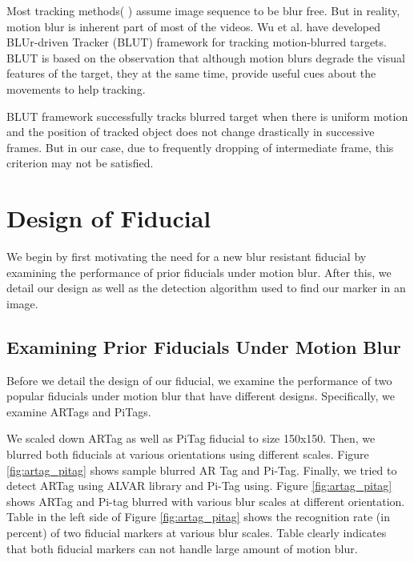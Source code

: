 \documentclass[runningheads]{llncs}
\begin{document}
Most tracking methods( \cite{Ross:2008,Wu:2009,Perez02}
\cite{Mei:2009} ) assume image sequence to be blur free. But in reality, motion
blur is inherent part of most of the videos. Wu et al.\cite{Wu:2011} have
developed BLUr-driven Tracker (BLUT) framework for tracking motion-blurred
targets. BLUT is based on the observation that although motion blurs degrade
the visual features of the target, they at the same time, provide useful cues
about the movements to help tracking.

BLUT framework successfully tracks blurred target when there is uniform motion
and the position of tracked object does not change drastically in successive
frames. But in our case, due to frequently dropping of intermediate frame, this
criterion may not be satisfied.

\section{Design of Fiducial}

We begin by first motivating the need for a new blur resistant fiducial by examining
the performance of prior fiducials under motion blur.  After this, we detail
our design as well as the detection algorithm used to find our marker in an image.

\subsection{Examining Prior Fiducials Under Motion Blur}

Before we detail the design of our fiducial, we examine the performance of two
popular fiducials under motion blur that have different designs. Specifically,
we examine ARTags\cite{Fiala05} and PiTags\cite{Pitag13}.

We scaled down ARTag as well as PiTag fiducial to size 150x150.  Then, we
blurred both fiducials at various orientations using different scales.
Figure \ref{fig:artag_pitag} shows sample blurred AR Tag and Pi-Tag. Finally, we
tried to detect ARTag using ALVAR library\cite{alvar} and Pi-Tag using\cite{ros_pitag}.
Figure \ref{fig:artag_pitag} shows ARTag and Pi-tag blurred with various blur
scales at different orientation. Table in the left side of Figure
\ref{fig:artag_pitag} shows the recognition rate (in percent) of two fiducial
markers at various blur scales. Table clearly indicates that both fiducial
markers can not handle large amount of motion blur.
\end{document}
